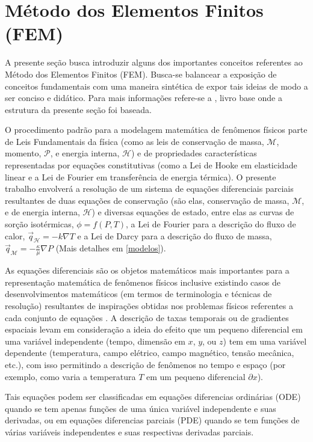 \section{Método dos Elementos Finitos (FEM)}\label{fem}
A presente seção busca introduzir alguns dos importantes conceitos referentes ao Método dos Elementos Finitos (FEM). Busca-se balancear a exposição de conceitos fundamentais com uma maneira sintética de expor tais ideias de modo a ser conciso e didático. Para mais informações refere-se a \cite{langtangen2017}, livro base onde a estrutura da presente seção foi baseada.

O procedimento padrão para a modelagem matemática de fenômenos físicos parte de Leis Fundamentais da física (como as leis de conservação de massa, $\mathcal{M}$, momento, $\mathcal{P}$, e energia interna, $\mathcal{H}$) e de propriedades características representadas por equações constitutivas (como a Lei de Hooke em elasticidade linear e a Lei de Fourier em transferência de energia térmica). O presente trabalho envolverá a resolução de um sistema de equações diferenciais parciais resultantes de duas equações de conservação (são elas, conservação de massa, $\mathcal{M}$, e de energia interna, $\mathcal{H}$) e diversas equações de estado, entre elas as curvas de sorção isotérmicas, $\phi = f(P, T)$, a Lei de Fourier para a descrição do fluxo de calor, $\vec{q}_\mathcal{H} = - k \nabla T$ e a Lei de Darcy para a descrição do fluxo de massa, $\vec{q}_\mathcal{M} = -  \frac{\kappa}{\mu} \nabla P$ (Mais detalhes em \ref{modelos}).

As equações diferenciais são os objetos matemáticos mais importantes para a
representação matemática de fenômenos físicos inclusive existindo casos de
desenvolvimentos matemáticos (em termos de terminologia e técnicas de resolução)
resultantes de inspirações obtidas nos problemas físicos referentes a cada
conjunto de equações \cite{Zauderer2006}. A descrição de taxas temporais ou de
gradientes espaciais levam em consideração a ideia do efeito que um pequeno
diferencial em uma variável independente (tempo, dimensão em $x$, $y$, ou $z$)
tem em uma variável dependente (temperatura, campo elétrico, campo magnético, tensão mecânica, etc.), com isso permitindo a descrição de fenômenos no tempo e espaço (por exemplo, como varia a temperatura $T$ em um pequeno diferencial $\partial x$).

Tais equações podem ser classificadas em equações diferencias ordinárias (ODE) quando se tem apenas funções de uma única variável independente e suas derivadas, ou em equações diferencias parciais (PDE) quando se tem funções de várias variáveis independentes e suas respectivas derivadas parciais.

